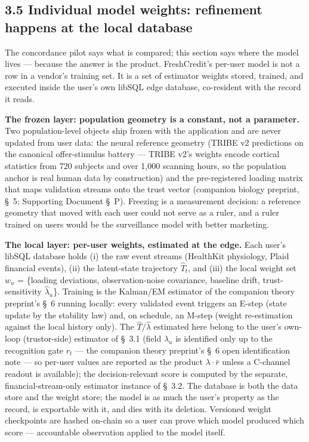 \documentclass[
]{article}
\begin{document}
\subsection{3.5 Individual model weights: refinement happens at the
local
database}\label{individual-model-weights-refinement-happens-at-the-local-database}

The concordance pilot says what is compared; this section says where the
model lives --- because the answer is the product. FreshCredit's
per-user model is not a row in a vendor's training set. It is a set of
estimator weights stored, trained, and executed inside the user's own
libSQL edge database, co-resident with the record it reads.

\textbf{The frozen layer: population geometry is a constant, not a
parameter.} Two population-level objects ship frozen with the
application and are never updated from user data: the neural reference
geometry (TRIBE v2 predictions on the canonical offer-stimulus battery
--- TRIBE v2's weights encode cortical statistics from 720 subjects and
over 1,000 scanning hours, so the population anchor is real human data
by construction) and the pre-registered loading matrix that maps
validation streams onto the trust vector (companion biology preprint,
§~5; Supporting Document §~P). Freezing is a measurement decision: a
reference geometry that moved with each user could not serve as a ruler,
and a ruler trained on users would be the surveillance model with better
marketing.

\textbf{The local layer: per-user weights, estimated at the edge.} Each
user's libSQL database holds (i) the raw event streams (HealthKit
physiology, Plaid financial events), (ii) the latent-state trajectory
\(\hat{T}_t\), and (iii) the local weight set \(w_u\) = \{loading
deviations, observation-noise covariance, baseline drift,
trust-sensitivity \(\hat{\lambda}_u\)\}. Training is the Kalman/EM
estimator of the companion theory preprint's §~6 running locally: every
validated event triggers an E-step (state update by the stability law)
and, on schedule, an M-step (weight re-estimation against the local
history only). The \(\hat{T}/\hat{\lambda}\) estimated here belong to
the user's own-loop (trustor-side) estimator of §~3.1 (field
\(\hat{\lambda}_u\) is identified only up to the recognition gate
\(r_t\) --- the companion theory preprint's §~6 open identification note
--- so per-user values are reported as the product
\(\lambda\cdot\bar{r}\) unless a C-channel readout is available); the
decision-relevant score is computed by the separate,
financial-stream-only estimator instance of §~3.2. The database is both
the data store and the weight store; the model is as much the user's
property as the record, is exportable with it, and dies with its
deletion. Versioned weight checkpoints are hashed on-chain so a user can
prove which model produced which score --- accountable observation
applied to the model itself.
\end{document}
